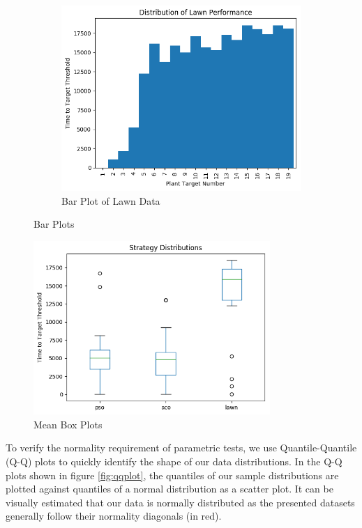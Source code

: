 \documentclass{report}
\begin{document}
\begin{figure}[H]
\begin{subfigure}{0.5\textwidth}
		\includegraphics[width=\textwidth]{images/lawn_bar}
		\caption{Bar Plot of Lawn Data}
		\label{fig:lawnbar}
	\end{subfigure}
	\caption{Bar Plots}
	\label{fig:barplots}
\end{figure}

\begin{figure}[H]
	\centering
	\includegraphics[width=0.8\textwidth]{images/mean_box_plots}
	\caption{Mean Box Plots}
	\label{fig:meanboxplots}
\end{figure}

To verify the normality requirement of parametric tests, we use Quantile-Quantile (Q-Q) plots to quickly identify the shape of our data distributions. In the Q-Q plots shown in figure \ref{fig:qqplot}, the quantiles of our sample distributions are plotted against quantiles of a normal distribution as a scatter plot. It can be visually estimated that our data is normally distributed as the presented datasets generally follow their normality diagonals (in red).
\end{document}
